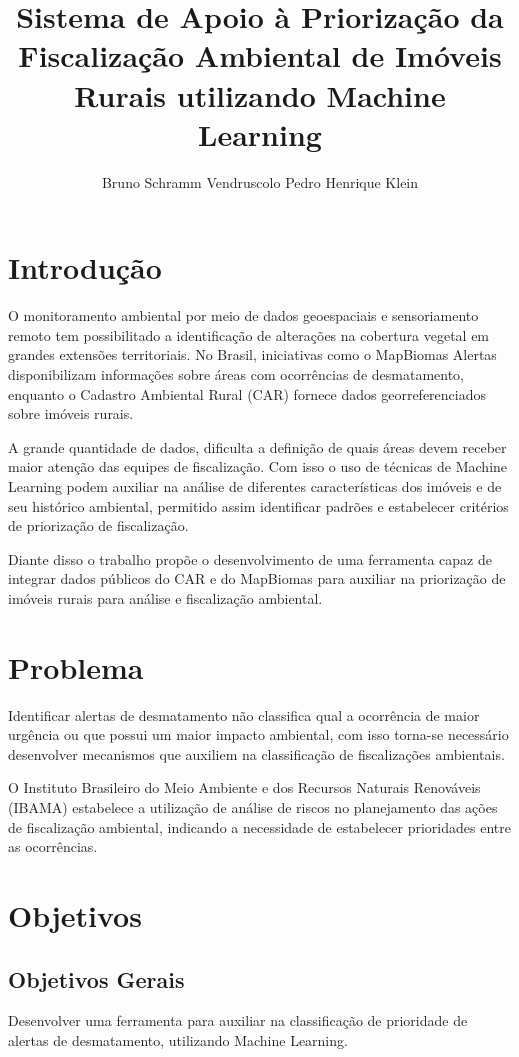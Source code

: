 \documentclass[12pt,a4paper]{article}
\title{
\textbf{Sistema de Apoio à Priorização da Fiscalização Ambiental de Imóveis Rurais utilizando Machine Learning}
}
\author{
Bruno Schramm Vendruscolo 
Pedro Henrique Klein
}
\date{}
\begin{document}
\maketitle

\section{Introdução}

O monitoramento ambiental por meio de dados geoespaciais e sensoriamento remoto tem possibilitado a identificação de alterações na cobertura vegetal em grandes extensões territoriais\cite{monitoramentdesmatamento}. No Brasil, iniciativas como o MapBiomas Alertas disponibilizam informações sobre áreas com ocorrências de desmatamento, enquanto o Cadastro Ambiental Rural (CAR) fornece dados georreferenciados sobre imóveis rurais.

A grande quantidade de dados, dificulta a definição de quais áreas devem receber maior atenção das equipes de fiscalização. Com isso o uso de técnicas de Machine Learning podem auxiliar na análise de diferentes características dos imóveis e de seu histórico ambiental, permitido assim identificar padrões e estabelecer critérios de priorização de fiscalização.

Diante disso o trabalho propõe o desenvolvimento de uma ferramenta capaz de integrar dados públicos do CAR e do MapBiomas para auxiliar na priorização de imóveis rurais para análise e fiscalização ambiental.

\section{Problema}

Identificar alertas de desmatamento não classifica qual a ocorrência de maior urgência ou que possui um maior impacto ambiental, com isso torna-se necessário desenvolver mecanismos que auxiliem na classificação de fiscalizações ambientais.

O Instituto Brasileiro do Meio Ambiente e dos Recursos Naturais Renováveis (IBAMA) estabelece a utilização de análise de riscos no planejamento das ações de fiscalização ambiental, indicando a necessidade de estabelecer prioridades entre as ocorrências. \cite{ibamalegislacao}

\section{Objetivos}

\subsection{Objetivos Gerais}
Desenvolver uma ferramenta para auxiliar na classificação de prioridade de alertas de desmatamento, utilizando Machine Learning.
\end{document}
